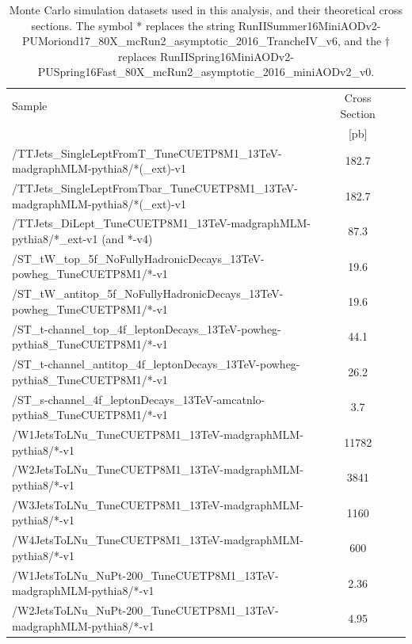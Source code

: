 \begin{table}[htp]
\caption[Monte Carlo simulation datasets used in this analysis, and
  their theoretical cross sections. The symbols * and $\dagger$ replace
  longer strings.]
  {Monte Carlo simulation datasets used in this analysis, and their
  theoretical cross sections. The symbol * replaces the string
  RunIISummer16MiniAODv2-PUMoriond17\_80X\_mcRun2\_asymptotic\_2016\_TrancheIV\_v6, %
  and the $\dagger$ replaces
  RunIISpring16MiniAODv2-PUSpring16Fast\_80X\_mcRun2\_asymptotic\_2016\_miniAODv2\_v0.}
\label{tab:stop:mcsamples}
\centering
{\footnotesize
\begin{tabular}{|l|c|c|c|}
\hline
Sample & Cross Section \\
& [pb] \\
\hline
/TTJets\_SingleLeptFromT\_TuneCUETP8M1\_13TeV-madgraphMLM-pythia8/*(\_ext)-v1 & 182.7 \\
/TTJets\_SingleLeptFromTbar\_TuneCUETP8M1\_13TeV-madgraphMLM-pythia8/*(\_ext)-v1 & 182.7 \\
/TTJets\_DiLept\_TuneCUETP8M1\_13TeV-madgraphMLM-pythia8/*\_ext-v1 (and *-v4) & 87.3 \\
/ST\_tW\_top\_5f\_NoFullyHadronicDecays\_13TeV-powheg\_TuneCUETP8M1/*-v1 & 19.6 \\
/ST\_tW\_antitop\_5f\_NoFullyHadronicDecays\_13TeV-powheg\_TuneCUETP8M1/*-v1 & 19.6 \\
/ST\_t-channel\_top\_4f\_leptonDecays\_13TeV-powheg-pythia8\_TuneCUETP8M1/*-v1 & 44.1 \\
/ST\_t-channel\_antitop\_4f\_leptonDecays\_13TeV-powheg-pythia8\_TuneCUETP8M1/*-v1 & 26.2 \\
/ST\_s-channel\_4f\_leptonDecays\_13TeV-amcatnlo-pythia8\_TuneCUETP8M1/*-v1 & 3.7 \\
/W1JetsToLNu\_TuneCUETP8M1\_13TeV-madgraphMLM-pythia8/*-v1 & 11782  \\
/W2JetsToLNu\_TuneCUETP8M1\_13TeV-madgraphMLM-pythia8/*-v1 & 3841 \\
/W3JetsToLNu\_TuneCUETP8M1\_13TeV-madgraphMLM-pythia8/*-v1 & 1160 \\
/W4JetsToLNu\_TuneCUETP8M1\_13TeV-madgraphMLM-pythia8/*-v1 & 600 \\
/W1JetsToLNu\_NuPt-200\_TuneCUETP8M1\_13TeV-madgraphMLM-pythia8/*-v1 & 2.36  \\
/W2JetsToLNu\_NuPt-200\_TuneCUETP8M1\_13TeV-madgraphMLM-pythia8/*-v1 & 4.95 \\

\end{tabular}}
\end{table}
